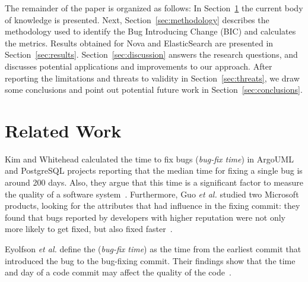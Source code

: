 \documentclass[10pt, conference]{IEEEtran}
\begin{document}

The remainder of the paper is organized as follows: In Section~\ref{sec:relatedwork} the current body of knowledge is presented. Next, Section~\ref{sec:methodology} describes the methodology used to identify the Bug Introducing Change (BIC) and calculates the metrics. Results obtained for Nova and ElasticSearch are presented in Section~\ref{sec:results}. Section~\ref{sec:discussion} answers the research questions, and discusses potential applications and improvements to our approach. After reporting the limitations and threats to validity in Section~\ref{sec:threats}, we draw some conclusions and point out potential future work in Section~\ref{sec:conclusions}.

\section{Related Work}
\label{sec:relatedwork}


Kim and Whitehead calculated the time to fix bugs (\emph{bug-fix time}) in ArgoUML and PostgreSQL projects reporting that the median time for fixing a single bug is around 200 days. Also, they argue that this time is a significant factor to measure the quality of a software system~\cite{kim2006long}. Furthermore, Guo \emph{et al.} studied two Microsoft products, looking for the attributes that had influence in the fixing commit: they found that bugs reported by developers with higher reputation were not only more likely to get fixed, but also fixed faster~\cite{guo2010characterizing}.

Eyolfson \emph{et al.} define the (\emph{bug-fix time}) as the time from the earliest commit that introduced the bug to the bug-fixing commit. Their findings show that the time and day of a code commit may affect the quality of the code~\cite{eyolfson2011time}.
\end{document}
